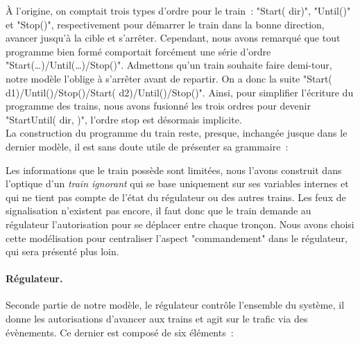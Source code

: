 \documentclass[oneside, a4paper, 11pt]{book}
\newcommand{\dirFmt}[1]{{\color{dircolor} #1}}
\newcommand{\posFmt}[1]{{\color{poscolor}{#1}}}
\newcommand\concatM[2]{#1;#2}
\begin{document}
\begin{sidebox}
	À l'origine, on comptait trois types d'ordre pour le train~: "Start(\dirFmt{dir})", "Until(\posFmt{dest})" et "Stop()", respectivement pour démarrer le train dans la bonne direction, avancer jusqu'à la cible et s'arrêter.
	Cependant, nous avons remarqué que tout programme bien formé comportait forcément une série d'ordre "Start(\dots)/Until(\dots)/Stop()". Admettons qu'un train souhaite faire demi-tour, notre modèle l'oblige à s'arrêter avant de repartir. On a donc la suite "Start(\dirFmt{d1})/Until(\posFmt{p1})/Stop()/Start(\dirFmt{d2})/Until(\posFmt{p2})/Stop()".
	Ainsi, pour simplifier l'écriture du programme des trains, nous avons fusionné les trois ordres pour devenir "StartUntil(\dirFmt{dir}, \posFmt{dest})", l'ordre stop est désormais implicite.
	\\La construction du programme du train reste, presque, inchangée jusque dans le dernier modèle, il est sans doute utile de présenter sa grammaire~:
	\vspace{0.3cm}\\
	\begin{grammar}
		\firstcasesubtil{T}{\concatM{seq}{T} \gralt \varepsilon}{}
		\firstcasesubtil{seq}{StartUntil(D,\posFmt{\mathcal{B}})}{}
		\firstcasesubtil{D}{\dirFmt{f} \gralt \dirFmt{b}}{}
	\end{grammar}
	\vspace{0.3cm}
\end{sidebox}


\noindent
Les informations que le train possède sont limitées, nous l'avons construit dans l'optique d'un \textit{train ignorant} qui se base uniquement sur ses variables internes et qui ne tient pas compte de l'état du régulateur ou des autres trains.
Les feux de signalisation n'existent pas encore, il faut donc que le train demande au régulateur l'autorisation pour se déplacer entre chaque tronçon.
Nous avons choisi cette modélisation pour centraliser l'aspect "commandement" dans le régulateur, qui sera présenté plus loin.

\paragraph{Régulateur.} %
Seconde partie de notre modèle, le régulateur contrôle l'ensemble du système, il donne les autorisations d'avancer aux trains et agit sur le trafic via des évènements.
Ce dernier est composé de six éléments~:
\end{document}
